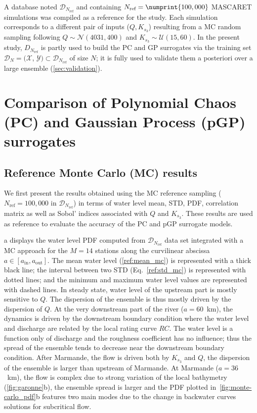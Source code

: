 A database noted $\mathcal{D}_{N_{\text{ref}}}$ and containing $N_{\text{ref}} = \numprint{100,000}$ MASCARET simulations was compiled as a reference for the study. Each simulation corresponds to a different pair of inputs ($Q, K_{s_3}$) resulting from a MC random sampling following $Q\sim\mathcal{N}(4031,400)$ and $K_{s_3} \sim \mathcal{U}(15,60)$. In the present study, $D_{N_{\text{ref}}}$ is partly used to build the PC and GP surrogates via the training set 
$\mathcal{D}_N = (\mathcal{X}$, $\mathcal{Y})\subset \mathcal{D}_{N_{\text{ref}}}$ of size $N$; it is fully used to validate them a posteriori over a large ensemble (\cref{sec:validation}).


\section{Comparison of Polynomial Chaos (PC) and Gaussian Process (pGP) surrogates}\label{sec:UQresults}

\subsection{Reference Monte Carlo (MC) results}
\label{sec:UQresults_ref}

We first present the results obtained using the MC reference sampling ($N_{\text{ref}} = 100,000$ in $\mathcal{D}_{N_{\text{ref}}}$) in terms of water level mean, STD, PDF, correlation matrix as well as Sobol' indices associated with $Q$ and $K_{s_3}$. These results are used as reference to evaluate the accuracy of the PC and pGP surrogate models.

a displays the water level PDF computed from $\mathcal{D}_{N_{\text{ref}}}$ data set integrated with a MC approach for the $M = 14$ stations along the curvilinear abscissa $a \in [a_{\text{in}}, a_{\text{out}}]$. The mean water level (\cref{ref:mean_mc}) is represented with a thick black line; the interval between two STD (Eq.~\ref{ref:std_mc}) is represented with dotted lines; and the minimum and maximum water level values are represented with dashed lines. In steady state, water level of the upstream part is mostly sensitive to $Q$. The dispersion of the ensemble is thus mostly driven by the dispersion of $Q$. At the very downstream part of the river ($a=60$~km), the dynamics is driven by the downstream boundary condition where the water level and discharge are related by the local rating curve $RC$. The water level is a function only of discharge and the roughness coefficient has no influence; thus the spread of the ensemble tends to decrease near the downstream boundary condition. After Marmande, the flow is driven both by $K_{s_3}$ and $Q$, the dispersion of the ensemble is larger than upstream of Marmande. At Marmande ($a = 36$~km), the flow is complex due to strong variation of the local bathymetry (\cref{fig:garonne}b), the ensemble spread is larger and the PDF plotted in~\cref{fig:monte-carlo_pdf}b features two main modes due to the change in backwater curves solutions for subcritical flow.
 
